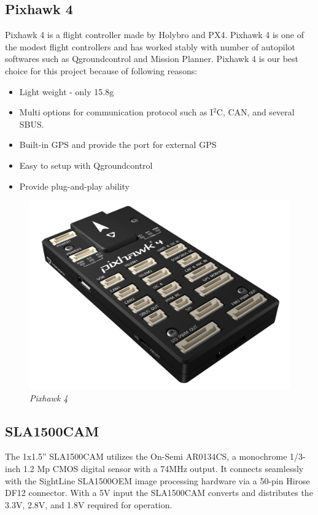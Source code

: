 \documentclass[11pt]{article}
\begin{document}
\subsection{Pixhawk 4}
Pixhawk 4 is a flight controller made by Holybro and PX4. Pixhawk 4 is one of the modest flight controllers and has worked stably with number of autopilot softwares such as Qgroundcontrol and Mission Planner. Pixhawk 4 is our best choice for this project because of following reasons:

\begin{itemize}

\item Light weight - only 15.8g
\item Multi options for communication protocol such as I$^2$C, CAN, and several SBUS.
\item Built-in GPS and provide the port for external GPS
\item Easy to setup with Qgroundcontrol
\item Provide plug-and-play ability     

\end{itemize}

\begin{figure}[h!bt]
\centering	
\includegraphics[width=4.5 in]{pixhawk4}
\caption{\textit{Pixhawk 4}}	
\end{figure}

\newpage

\subsection{SLA1500CAM}

The 1x1.5” SLA1500CAM utilizes the On-Semi AR0134CS, a monochrome 1/3-inch 1.2 Mp CMOS digital sensor with a 74MHz output. It connects seamlessly with the SightLine SLA1500OEM image processing hardware via a 50-pin Hirose DF12 connector. With a 5V input the SLA1500CAM  converts and distributes the 3.3V, 2.8V, and 1.8V required for operation.
\end{document}
